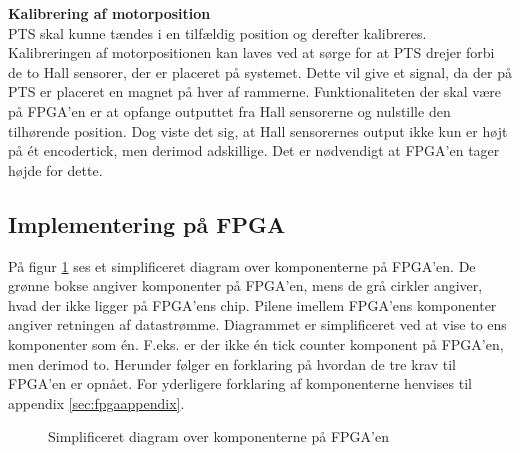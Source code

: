 \textbf{Kalibrering af motorposition}\\
PTS skal kunne tændes i en tilfældig position og derefter kalibreres.
Kalibreringen af motorpositionen kan laves ved at sørge for at PTS drejer forbi 
de to Hall sensorer, der er placeret på systemet. Dette vil give et signal, da 
der på PTS er placeret en magnet på hver af rammerne.
Funktionaliteten der skal være på FPGA'en er at opfange outputtet fra 
Hall sensorerne og nulstille den tilhørende position.
Dog viste det sig, at Hall sensorernes output ikke kun er højt på ét encodertick, 
men derimod adskillige. Det er nødvendigt at FPGA'en tager højde for 
dette.

\subsection{Implementering på FPGA}
På figur \ref{fig:FPGA_blok} ses et simplificeret diagram over komponenterne på FPGA'en. 
De grønne bokse angiver komponenter på FPGA'en, mens de grå cirkler angiver, hvad der ikke ligger på 
FPGA'ens chip. Pilene imellem FPGA'ens komponenter angiver retningen af 
datastrømme. Diagrammet er simplificeret ved at vise to ens komponenter som én. 
F.eks. er der ikke én tick counter komponent på FPGA'en, men derimod to.
Herunder følger en forklaring på hvordan de tre krav til FPGA'en er opnået. For 
yderligere forklaring af komponenterne henvises til appendix 
\ref{sec:fpgaappendix}.

\begin{figure}[!th]
\centering
\begin{tikzpicture}[node distance = 5 cm,scale=1]

\end{tikzpicture}
\caption[Diagram over FPGA komponenter]{Simplificeret diagram over komponenterne på FPGA'en}
\label{fig:FPGA_blok}
\end{figure}

